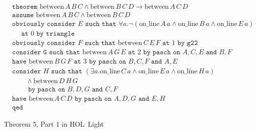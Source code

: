 \documentclass{article}
\newcommand{\online}[2]{\text{on\_line}\,#1\,#2}
\newcommand{\between}[3]{\text{between}\,#1\,#2\,#3}
\newcommand{\Triangle}[4]{\forall #1.\neg(\online{#2}{a}\wedge \online{#3}{a}\wedge \online{#4}{a})}
\renewcommand{\implies}{\longrightarrow}
\begin{document}
\begin{figure}
\begin{align*}
&\texttt{theorem }\between{A}{B}{C} \wedge \between{B}{C}{D} \implies \between{A}{C}{D}\\
&\texttt{assume }\between{A}{B}{C} \wedge \between{B}{C}{D}\\
&\texttt{obviously consider } E \texttt{ such that } \Triangle{a}{A}{B}{E}\\
&\quad\texttt{ at } 0 \texttt{ by triangle}\\
&\texttt{obviously consider } F \texttt{ such that } \between{C}{E}{F} \texttt{ at } 1 \texttt { by g22}\\
&\texttt{consider G such that } \between{A}{G}{E} \texttt{ at } 2 \texttt{ by pasch on } A,C,E \texttt{ and } B,F\\
&\texttt{have } \between{B}{G}{F} \texttt{ at } 3 \texttt{ by pasch on } B,C,F \texttt{ and } A,E\\
&\texttt{consider } H \texttt{ such that } (\exists a. \online{C}{a}\wedge \online{E}{a} \wedge \online{H}{a})\\
&\qquad\wedge \between{D}{H}{G}\\
&\qquad\texttt{ by pasch on } B,D,G \texttt{ and } C,F\\
&\texttt{have } \between{A}{C}{D} \texttt{ by pasch on } A,D,G \texttt{ and } E,H\\
&\texttt{qed}
\end{align*}
\caption{Theorem 5, Part 1 in HOL~Light}
\label{fig:Theorem51Formalised}
\end{figure}
\end{document}
